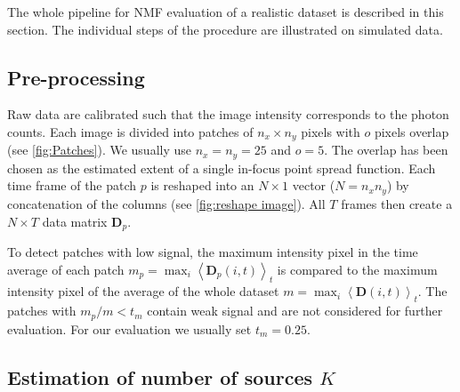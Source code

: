 The whole pipeline for NMF evaluation of a realistic dataset is described in this section.  The individual steps of the procedure are illustrated on simulated data. 


\subsection{Pre-processing \label{sec:preproc}}

Raw data are calibrated such that the image intensity corresponds to the photon counts. Each image is divided into patches of $n_x\times n_y$ pixels with $o$ pixels overlap (see \autoref{fig:Patches}). We usually use $n_x=n_y=25$ and $o=5$. The overlap has been chosen as the estimated extent of a single in-focus point spread function. Each time frame of the patch $p$ is reshaped into an $N\times1$ vector ($N=n_x n_y$)  by concatenation of the columns (see \autoref{fig:reshape image}). All $T$ frames then create a $N \times T$ data matrix $\bm{D}_p$.

To detect patches with low signal, the maximum intensity pixel in the time average of each patch $m_p=\max_i\left\langle \bm{D}_p(i,t)\right\rangle _t$ is compared to the maximum intensity pixel of the average of the whole dataset $m=\max_i\left\langle \bm{D}(i,t)\right\rangle _t$. The patches with $m_p/m< t_m$ contain weak signal and are not considered for further evaluation. For our evaluation we usually set $t_m=0.25.$

\subsection{Estimation of number of sources $K$\label{sub:Estimation-of-number-of-sources}}

